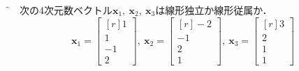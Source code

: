 \begin{tcolorbox}[breakable]
	\f{例}　次の4次元数ベクトル$\bm{x}_1,\ \bm{x}_2,\ \bm{x}_3$は線形独立か線形従属か．
	\begin{equation*}
		\bm{x}_1 =
			\begin{bmatrix*}[r]
				1\\ 1\\ -1\\ 2
			\end{bmatrix*}
		,\ \bm{x}_2 =
			\begin{bmatrix*}[r]
				-2\\ -1\\ 2\\ 1
			\end{bmatrix*}
		,\ \bm{x}_3 =
			\begin{bmatrix*}[r]
				3\\ 2\\ 1\\ 1
			\end{bmatrix*}
	\end{equation*}
	
	\tcblower


\end{tcolorbox}
